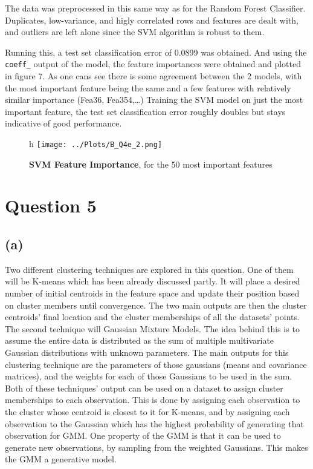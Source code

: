 \documentclass[12pt]{report} %
\begin{document}
The data was preprocessed in this same way as for the Random Forest Classifier. Duplicates, low-variance, and higly correlated rows and features are dealt with, and outliers are left alone since the SVM algorithm is robust to them.  

Running this, a test set classification error of 0.0899 was obtained. And using the \texttt{coeff\_} output of the model, the feature importances were obtained and plotted in figure 7. As one cans see there is some agreement between the 2 models, with the most important feature being the same and a few features with relatively similar importance (Fea36, Fea354,\ldots)  
Training the SVM model on just the most important feature, the test set classification error roughly doubles but stays indicative of good performance.

\begin{figure}{h}
    \centering
    \texttt{[image: ../Plots/B\_Q4e\_2.png]}
    \caption{\textbf{SVM Feature Importance}, for the 50 most important features}
\end{figure}

\newpage

\section*{Question 5}

\subsection*{(a)}

Two different clustering techniques are explored in this question. One of them will be K-means which has been already discussed partly. It will place a desired number of initial centroids in the feature space and update their position based on cluster members until convergence. The two main outputs are then the cluster centroids' final location and the cluster memberships of all the datasets' points.  
The second technique will Gaussian Mixture Models. The idea behind this is to assume the entire data is distributed as the sum of multiple multivariate Gaussian distributions with unknown parameters\cite[p. 260]{sklearn_book}. The main outputs for this clustering technique are the parameters of those gaussians (means and covariance matrices), and the weights for each of those Gaussians to be used in the sum.  
Both of these techniques' output can be used on a dataset to assign cluster memberships to each observation. This is done by assigning each observation to the cluster whose centroid is closest to it for K-means, and by assigning each observation to the Gaussian which has the highest probability of generating that observation for GMM. One property of the GMM is that it can be used to generate new observations, by sampling from the weighted Gaussians. This makes the GMM a generative model.  
\end{document}
